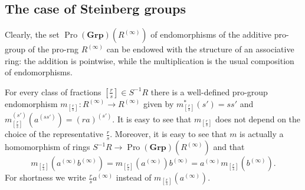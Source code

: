 \documentclass[oneside, 11pt]{amsart}
\numberwithin{equation}{section}
\theoremstyle{definition}
\theoremstyle{remark}
\DeclareMathOperator{\Pro}{Pro}
\newcommand{\Group}{\mathbf{Grp}}
\begin{document}
\subsection{The case of Steinberg groups}
Clearly, the set $\Pro(\Group)(R^{(\infty)})$ of endomorphisms of the additive pro-group of the pro-rng $R^{(\infty)}$ can be endowed with the structure of an associative ring: the addition is 
pointwise, 
while the multiplication is the usual composition of endomorphisms.

For every class of fractions \([\frac rs] \in S^{-1} R\) there is a well-defined pro-group endomorphism \(m_{[\frac rs]} \colon R^{(\infty)} \to R^{(\infty)}\) given by \(m_{[\frac rs]}^*(s') = ss'\) and \(m_{[\frac rs]}^{(s')}(a^{(ss')}) = (ra)^{(s')}\). It is easy to see that $m_{[\frac{r}{s}]}$ does not depend on the choice of the representative \(\tfrac r s\). Moreover, it is easy to see that \(m\) is actually a homomorphism of rings \(S^{-1} R \to \Pro(\Group)(R^{(\infty)})\) and that 
\begin{equation} \label{eq:m-mult} m_{[\frac rs]}(a^{(\infty)} b^{(\infty)}) = m_{[\frac rs]}(a^{(\infty)}) b^{(\infty)} = a^{(\infty)} m_{[\frac rs]}(b^{(\infty)}).\end{equation}
For shortness we write \(\frac rs a^{(\infty)}\) instead of \(m_{[\frac rs]}(a^{(\infty)})\). 
\end{document}

